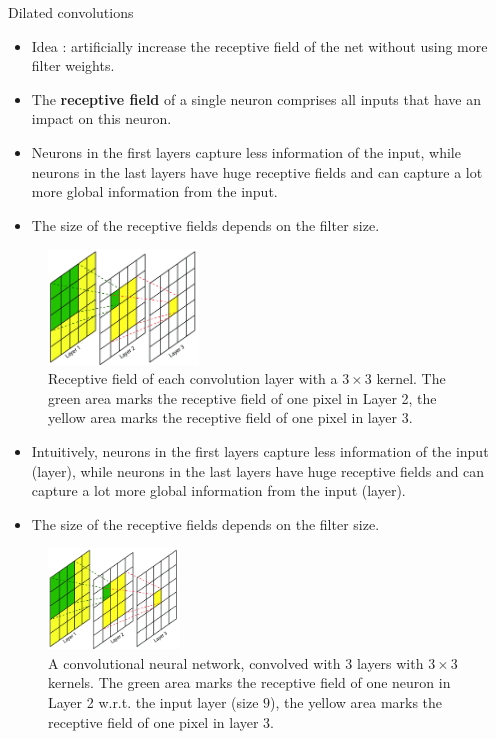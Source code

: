 \begin{vbframe}{Dilated convolutions}

    \begin{itemize}
        \item Idea : artificially increase the receptive field of the net without using more filter weights.
        \item The \textbf{receptive field} of a single neuron comprises all inputs that have an impact on this neuron. 
        \item Neurons in the first layers capture less information of the input, while neurons in the last layers have huge receptive fields and can capture a lot more global information from the input. 
        \item The size of the receptive fields depends on the filter size. 
    \end{itemize}

    \vspace*{-0.5cm}

    \begin{figure}
        \centering
        \includegraphics[width=4cm]{plots/05_conv_variations/dilated/receptive_field2.png}
        \caption{Receptive field of each convolution layer with a $3 \times 3$ kernel. The green area marks the receptive field of one pixel in Layer 2, the yellow area marks the receptive field of one pixel in layer 3. } 
    \end{figure}


\begin{itemize}
        \item Intuitively, neurons in the first layers capture less information of the input (layer), while neurons in the last layers have huge receptive fields and can capture a lot more global information from the input (layer). 
        \item The size of the receptive fields depends on the filter size. 
    \end{itemize}

    \vspace*{-0.5cm}

    \begin{figure}
        \centering
        \includegraphics[width=3.5cm]{plots/05_conv_variations/dilated/receptive_field2.png}
        \caption{A convolutional neural network, convolved with $3$ layers with $3 \times 3$ kernels. The green area marks the receptive field of one neuron in Layer 2 w.r.t. the input layer (size $9$), the yellow area marks the receptive field of one pixel in layer 3. } 
    \end{figure}


\end{vbframe}
